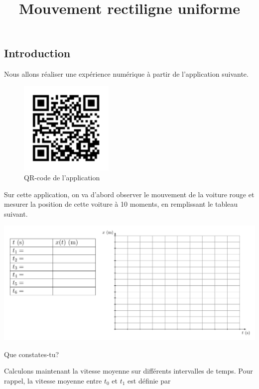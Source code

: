\documentclass[
  a4paper,
  DIV=11,
  numbers=noendperiod,
  sans]{scrartcl}
\title{Mouvement rectiligne uniforme}
\author{}
\date{}
\theoremstyle{definition}
\theoremstyle{definition}
\theoremstyle{remark}
\begin{document}
\maketitle


\subsection{Introduction}\label{introduction}

Nous allons réaliser une expérience numérique à partir de l'application
suivante.

\begin{figure}[H]

{\centering \includegraphics[width=0.4\textwidth,height=\textheight]{figures/mru/mru-1.pdf}

}

\caption{QR-code de l'application}

\end{figure}%

Sur cette application, on va d'abord observer le mouvement de la voiture
rouge et mesurer la position de cette voiture à 10 moments, en
remplissant le tableau suivant.

\includegraphics[width=1\textwidth,height=\textheight]{figures/mru/fig2.pdf}

Que constates-tu?

Calculons maintenant la vitesse moyenne sur différents intervalles de
temps. Pour rappel, la vitesse moyenne entre \(t_0\) et \(t_1\) est
définie par
\end{document}
